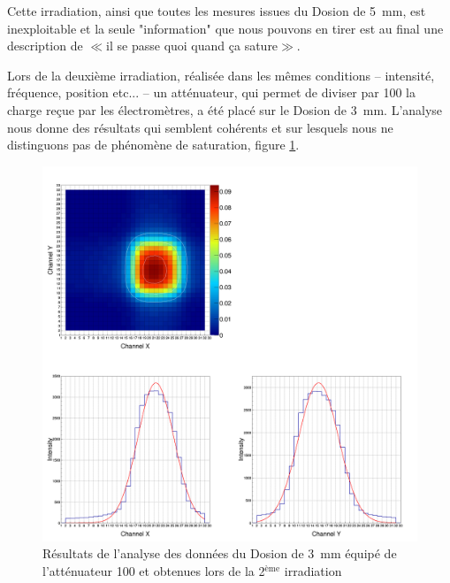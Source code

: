 \documentclass[a4paper,11pt]{article}
\begin{document}
Cette irradiation, ainsi que toutes les mesures issues du Dosion de 5~mm, est inexploitable et la seule "information" que nous pouvons en tirer est au final une description de $\ll$il se passe quoi quand ça sature$\gg$.

Lors de la deuxième irradiation, réalisée dans les mêmes conditions -- intensité, fréquence, position etc... -- un atténuateur, qui permet de diviser par 100 la charge reçue par les électromètres, a été placé sur le Dosion de 3~mm.
L'analyse nous donne des résultats qui semblent cohérents et sur lesquels nous ne distinguons pas de phénomène de saturation, figure \ref{fig:area_1_1000}.
\begin{figure}[h]
\begin{center}
\includegraphics[width=\linewidth]{Area_1_1000.png} 
\caption{\label{fig:area_1_1000}\footnotesize{Résultats de l'analyse des données du Dosion de 3~mm équipé de l'atténuateur 100 et obtenues lors de la 2$^{\text{ème}}$ irradiation}}
\end{center}
\end{figure}
\end{document}
